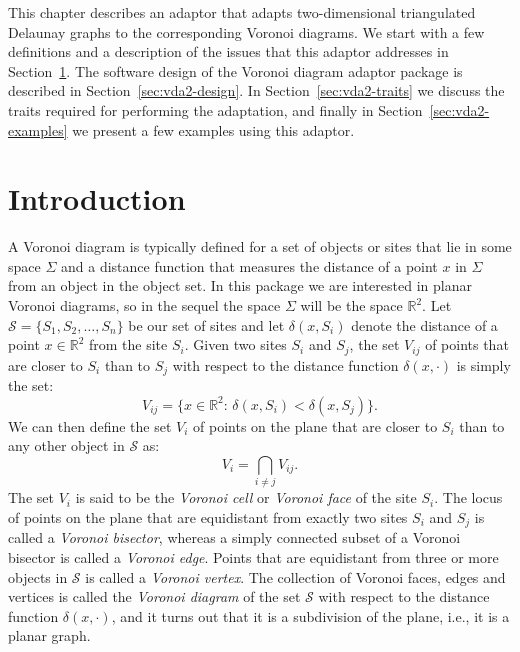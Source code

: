 
This chapter describes an adaptor that adapts two-dimensional
triangulated Delaunay graphs to the corresponding Voronoi diagrams.
We start with a few
definitions and a description of the issues that this adaptor
addresses in Section~\ref{sec:vda2-intro}. The software design
of the Voronoi diagram adaptor package is described in
Section~\ref{sec:vda2-design}. In Section~\ref{sec:vda2-traits} we
discuss the traits required for performing the adaptation, and finally
in Section~\ref{sec:vda2-examples} we present a few examples using
this adaptor.

\section{Introduction}
\label{sec:vda2-intro}

A Voronoi diagram is typically defined for a set of objects or sites
that lie in some space $\Sigma$ and a distance function that measures
the distance of a point $x$ in $\Sigma$ from an object in the object
set. In this package we are interested in planar Voronoi diagrams, so
in the sequel the space $\Sigma$ will be the space $\mathbb{R}^2$. Let
$\mathcal{S}=\{S_1,S_2,\ldots,S_n\}$ be our set of sites and let
$\delta(x,S_i)$ denote the distance of a point $x\in\mathbb{R}^2$ from
the site $S_i$. Given two sites $S_i$ and $S_j$, the set $V_{ij}$
of points that are closer to $S_i$ than to $S_j$ with respect to the
distance function $\delta(x,\cdot)$ is simply the set:
\[   V_{ij} = \{x\in\mathbb{R}^2:\, \delta(x,S_i)<\delta(x,S_j)\}. \]
We can then define the set $V_i$ of points on the plane that are closer to
$S_i$ than to any other object in $\mathcal{S}$ as:
\[  V_i = \bigcap_{i\neq j} V_{ij}. \]
The set $V_i$ is said to be the \emph{Voronoi cell} or \emph{Voronoi face} 
of the site $S_i$. The locus of points on the plane that are
equidistant from exactly two sites $S_i$ and $S_j$ is called a
\emph{Voronoi bisector}, whereas a simply connected subset of a
Voronoi bisector is called a \emph{Voronoi edge}. Points that are
equidistant from three or more objects in $\mathcal{S}$ is called a
\emph{Voronoi vertex}.
The collection of Voronoi faces, edges and vertices is called the
\emph{Voronoi diagram} of the set $\mathcal{S}$ with respect to the
distance function $\delta(x,\cdot)$, and it turns out that it is a
subdivision of the plane, i.e., it is a planar graph.

